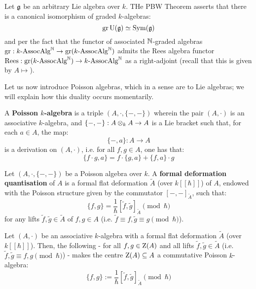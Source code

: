         \begin{example} \label{example: rees_algebras}
            Let $\mathfrak{g}$ be an arbitrary Lie algebra over $k$. THe PBW Theorem asserts that there is a canonical isomorphism of graded $k$-algebras:
                $$\operatorname{gr} \mathrm{U}(\mathfrak{g}) \simeq \mathrm{Sym}(\mathfrak{g})$$
            and per the fact that the functor of associated $\mathbb{N}$-graded algebras $\operatorname{gr}: k\text{-}\mathrm{Assoc}\mathrm{Alg}^{\mathbb{N}} \to \operatorname{gr}(k\text{-}\mathrm{Assoc}\mathrm{Alg}^{\mathbb{N}})$ admits the Rees algebra functor $\operatorname{Rees}: \operatorname{gr}(k\text{-}\mathrm{Assoc}\mathrm{Alg}^{\mathbb{N}}) \to k\text{-}\mathrm{Assoc}\mathrm{Alg}^{\mathbb{N}}$ as a right-adjoint (recall that this is given by $A \mapsto $).
        \end{example}

        Let us now introduce Poisson algebras, which in a sense are  to Lie algebras; we will explain how this duality occurs momentarily. 
        \begin{definition} \label{def: poisson_algebras}
            A \textbf{Poisson $k$-algebra} is a triple $(A, \cdot, \{-, -\})$ wherein the pair $(A, \cdot)$ is an associative $k$-algebra, and $\{-, -\}: A \tensor_k A \to A$ is a Lie bracket such that, for each $a \in A$, the map:
                $$\{-, a\}: A \to A$$
            is a derivation on $(A, \cdot)$, i.e. for all $f, g \in A$, one has that:
                $$\{f \cdot g, a\} = f \cdot \{g, a\} + \{f, a\} \cdot g$$
        \end{definition}
        \begin{definition} \label{def: deformation_quantisation}
            Let $(A, \cdot, \{-, -\})$ be a Poisson algebra over $k$. A \textbf{formal deformation quantisation} of $A$ is a formal flat deformation $\tilde{A}$ (over $k[\![\hbar]\!]$) of $A$, endowed with the Poisson structure given by the commutator $[-, -]_{\tilde{A}}$, such that:
                $$\{f, g\} = \frac{1}{\hbar}[\tilde{f}, \tilde{g}]_{\tilde{A}} \pmod{\hbar}$$
            for any lifts $\tilde{f}, \tilde{g} \in \tilde{A}$ of $f, g \in A$ (i.e. $\tilde{f} \equiv f, \tilde{g} \equiv g \pmod{\hbar}$).
        \end{definition}
        \begin{lemma} \label{lemma: poisson_brackets_from_formal_flat_deformations}
            Let $(A, \cdot)$ be an associative $k$-algebra with a formal flat deformation $\tilde{A}$ (over $k[\![\hbar]\!]$). Then, the following - for all $f, g \in \mathrm{Z}(A)$ and all lifts $\tilde{f}, \tilde{g} \in \tilde{A}$ (i.e. $\tilde{f}, \tilde{g} \equiv f, g \pmod{\hbar}$) - makes the centre $\mathrm{Z}(A) \subseteq A$ a commutative Poisson $k$-algebra:
                $$\{f, g\} := \frac{1}{\hbar}[\tilde{f}, \tilde{g}]_{\tilde{A}} \pmod{\hbar}$$
        \end{lemma}
